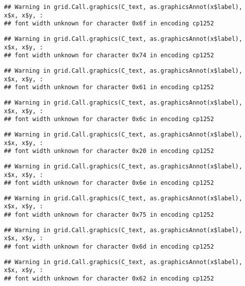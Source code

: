 \documentclass[
]{article}
\begin{document}
\begin{verbatim}
## Warning in grid.Call.graphics(C_text, as.graphicsAnnot(x$label), x$x, x$y, :
## font width unknown for character 0x6f in encoding cp1252
\end{verbatim}

\begin{verbatim}
## Warning in grid.Call.graphics(C_text, as.graphicsAnnot(x$label), x$x, x$y, :
## font width unknown for character 0x74 in encoding cp1252
\end{verbatim}

\begin{verbatim}
## Warning in grid.Call.graphics(C_text, as.graphicsAnnot(x$label), x$x, x$y, :
## font width unknown for character 0x61 in encoding cp1252
\end{verbatim}

\begin{verbatim}
## Warning in grid.Call.graphics(C_text, as.graphicsAnnot(x$label), x$x, x$y, :
## font width unknown for character 0x6c in encoding cp1252
\end{verbatim}

\begin{verbatim}
## Warning in grid.Call.graphics(C_text, as.graphicsAnnot(x$label), x$x, x$y, :
## font width unknown for character 0x20 in encoding cp1252
\end{verbatim}

\begin{verbatim}
## Warning in grid.Call.graphics(C_text, as.graphicsAnnot(x$label), x$x, x$y, :
## font width unknown for character 0x6e in encoding cp1252
\end{verbatim}

\begin{verbatim}
## Warning in grid.Call.graphics(C_text, as.graphicsAnnot(x$label), x$x, x$y, :
## font width unknown for character 0x75 in encoding cp1252
\end{verbatim}

\begin{verbatim}
## Warning in grid.Call.graphics(C_text, as.graphicsAnnot(x$label), x$x, x$y, :
## font width unknown for character 0x6d in encoding cp1252
\end{verbatim}

\begin{verbatim}
## Warning in grid.Call.graphics(C_text, as.graphicsAnnot(x$label), x$x, x$y, :
## font width unknown for character 0x62 in encoding cp1252
\end{verbatim}
\end{document}

